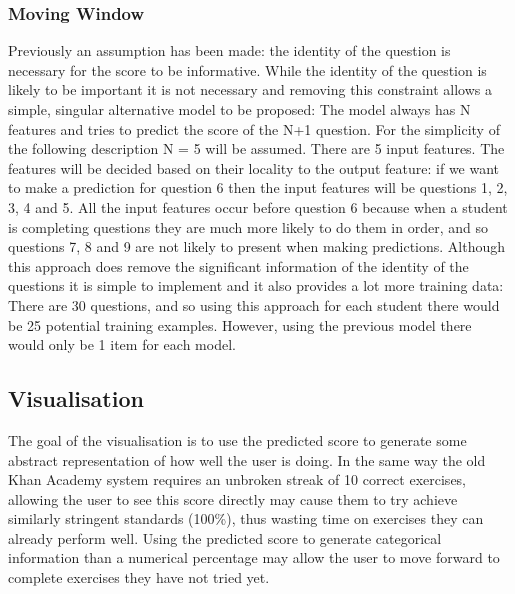 \subsubsection{Moving Window}
Previously an assumption has been made: the identity of the question is necessary for the score to be informative. While the identity of the question is likely to be important it is not necessary and removing this constraint allows a simple, singular alternative model to be proposed: The model always has N features and tries to predict the score of the N+1 question. For the simplicity of the following description N = 5 will be assumed.
There are 5 input features. The features will be decided based on their locality to the output feature: if we want to make a prediction for question 6 then the input features will be questions 1, 2, 3, 4 and 5. All the input features occur before question 6 because when a student is completing questions they are much more likely to do them in order, and so questions 7, 8 and 9 are not likely to present when making predictions. 
Although this approach does remove the significant information of the identity of the questions it is simple to implement and it also provides a lot more training data: There are 30 questions, and so using this approach for each student there would be 25 potential training examples. However, using the previous model there would only be 1 item for each model.

\subsection{Visualisation}
The goal of the visualisation is to use the predicted score to generate some abstract representation of how well the user is doing. In the same way the old Khan Academy system requires an unbroken streak of 10 correct exercises, allowing the user to see this score directly may cause them to try achieve similarly stringent standards (100\%), thus wasting time on exercises they can already perform well. Using the predicted score to generate categorical information than a numerical percentage may allow the user to move forward to complete exercises they have not tried yet.

